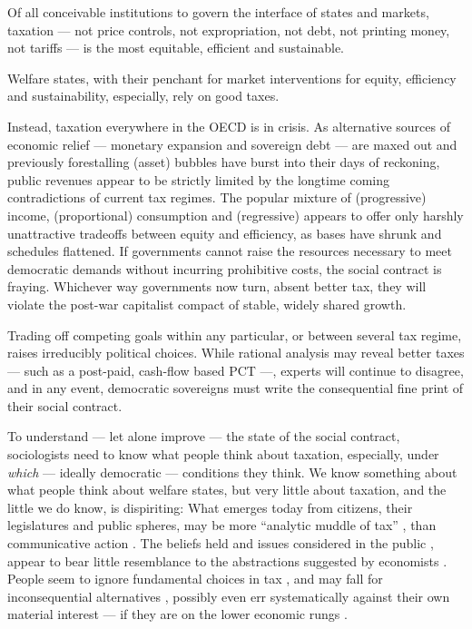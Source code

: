 Of all conceivable institutions to govern the interface of states and markets, taxation --- not price controls, not expropriation, not debt, not printing money, not tariffs --- is  the most equitable, efficient and sustainable.

Welfare states, with their penchant for market interventions for equity, efficiency and sustainability, especially, rely on good taxes.

Instead, taxation everywhere in the \gls{OECD} is in crisis.
As alternative sources of economic relief --- monetary expansion and sovereign debt --- are maxed out and previously forestalling (asset) bubbles have burst into their days of reckoning, public revenues appear to be strictly limited by the longtime coming contradictions of current tax regimes.
The popular mixture of (progressive) income, (proportional) consumption and (regressive) appears to offer only harshly unattractive tradeoffs between equity and efficiency, as bases have shrunk and schedules flattened.
If governments cannot raise the resources necessary to meet democratic demands without incurring prohibitive costs, the social contract is fraying.
Whichever way governments now turn, absent better tax, they will violate the post-war capitalist compact of stable, widely shared growth.

Trading off competing goals within any particular, or between several tax regime, raises irreducibly political choices.
While rational analysis may reveal better taxes --- such as a post-paid, cash-flow based \gls{PCT} ---, experts will continue to disagree, and in any event, democratic sovereigns must write the consequential fine print of their social contract.


To understand --- let alone improve --- the state of the social contract, sociologists need to know what people think about taxation, especially, under \emph{which} --- ideally democratic --- conditions they think.
We know something about what people think about welfare states, but very little about taxation, and the little we do know, is dispiriting:
What emerges today from citizens, their legislatures and public spheres, may be more ``analytic muddle of tax'' \citep[862]{McCaffery2005}, than communicative action \citep{Habermas-1984-aa}.
The beliefs held and issues considered in the public \citep[for example,][]{Caplan2007}, appear to bear little resemblance to the abstractions suggested by economists \cite[for example,][]{Harberger1974}.
People seem to ignore fundamental choices in tax \citep[for example,][]{McCafferyHines2010}, and may fall for inconsequential alternatives \citep[for example,][]{SausgruberTyran2011}, possibly even err systematically against their own material interest --- if they are on the lower economic rungs \citep[for a German example,][]{Kemmerling2009}.

